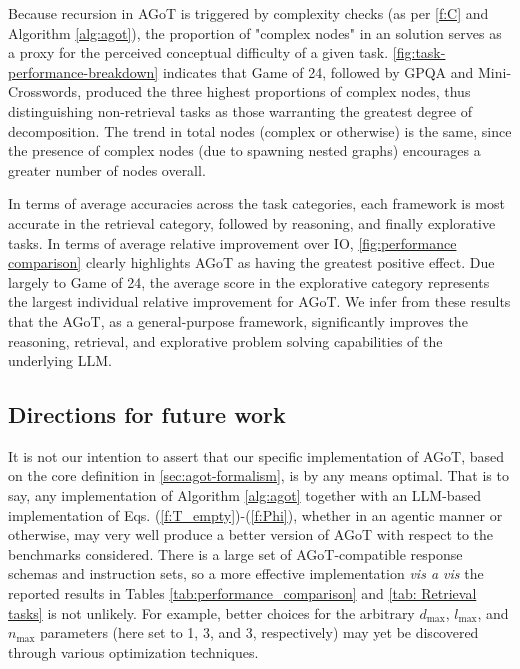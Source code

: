 \documentclass{article}
\begin{document}
Because recursion in AGoT is triggered by complexity checks (as per \autoref{f:C} and Algorithm \ref{alg:agot}), the proportion of "complex nodes" in an solution serves as a proxy for the perceived conceptual difficulty of a given task. \autoref{fig:task-performance-breakdown} indicates that Game of 24, followed by GPQA and Mini-Crosswords, produced the three highest proportions of complex nodes, thus distinguishing non-retrieval tasks as those warranting the greatest degree of decomposition. The trend in total nodes (complex or otherwise) is the same, since the presence of complex nodes (due to spawning nested graphs) encourages a greater number of nodes overall.

In terms of average accuracies across the task categories, each framework is most accurate in the retrieval category, followed by reasoning, and finally explorative tasks. In terms of average relative improvement over IO, \autoref{fig:performance comparison} clearly highlights AGoT as having the greatest positive effect. Due largely to Game of 24, the average score in the explorative category represents the largest individual relative improvement for AGoT. We infer from these results that the AGoT, as a general-purpose framework, significantly improves the reasoning, retrieval, and explorative problem solving capabilities of the underlying LLM.

\subsection{Directions for future work}
It is not our intention to assert that our specific implementation of AGoT, based on the core definition in \autoref{sec:agot-formalism}, is by any means optimal. That is to say, any implementation of Algorithm \ref{alg:agot} together with an LLM-based implementation of Eqs. (\ref{f:T_empty})-(\ref{f:Phi}), whether in an agentic manner or otherwise, may very well produce a better version of AGoT with respect to the benchmarks considered. There is a large set of AGoT-compatible response schemas and instruction sets, so a more effective implementation \textit{vis a vis} the reported results in Tables \ref{tab:performance_comparison} and \ref{tab: Retrieval tasks} is not unlikely. For example, better choices for the arbitrary $d_\text{max}$, $l_\text{max}$, and $n_\text{max}$ parameters (here set to 1, 3, and 3, respectively) may yet be discovered through various optimization techniques. 
\end{document}

